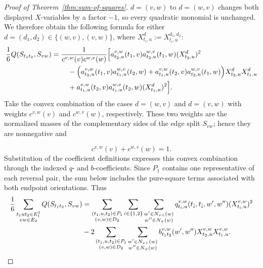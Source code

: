 \documentclass[12pt]{article}
\begin{document}
\begin{proof}[Proof of Theorem~\ref{thm:sum-of-squares}]
$d=(v,w)$ to $d=(w,v)$ changes both displayed $X$-variables by a factor
$-1$, so every quadratic monomial is unchanged.  We therefore obtain the
following formula for either
$d=(d_1,d_2)\in\{(w,v),(v,w)\}$, where
$X_{t_i,u}^{d}:=X_{t_i,u}^{d_1,d_2}$:
\begin{equation}\label{eq:display-037}
\begin{aligned}
\frac16Q(S_{t_1t_2},S_{vw})
={}&\frac1{c^{v,w}(v)c^{w,v}(w)}
\Bigl[
a_{t_2,u}^{v,w}(t_1,v)a_{t_2,u}^{w,v}(t_1,w)(X_{t_2,u}^{d})^2\\
&\quad-\Bigl(
a_{t_2,u}^{v,w}(t_1,v)a_{t_1,u}^{w,v}(t_2,w)
+a_{t_1,u}^{v,w}(t_2,v)a_{t_2,u}^{w,v}(t_1,w)
\Bigr)X_{t_2,u}^{d}X_{t_1,u}^{d}\\
&\quad+a_{t_1,u}^{v,w}(t_2,v)a_{t_1,u}^{w,v}(t_2,w)(X_{t_1,u}^{d})^2
\Bigr].
\end{aligned}
\end{equation}
Take the convex combination of the cases $d=(w,v)$ and $d=(v,w)$ with
weights $c^{v,w}(v)$ and $c^{w,v}(w)$, respectively.  These two weights are
the normalized masses of the complementary sides of the edge split $S_{vw}$;
hence they are nonnegative and

\begin{equation}\label{eq:display-038}
c^{v,w}(v)+c^{w,v}(w)=1.
\end{equation}
Substitution of the coefficient definitions expresses this convex combination
through the indexed $q$- and $b$-coefficients.
Since $P_1$ contains one representative of each
reversal pair, the sum below includes the pure-square terms associated with
both endpoint orientations.  Thus
\begin{align}
\frac16\sum_{\substack{t_1ut_2\in E_1^2\\vw\in E_2}}
Q(S_{t_1t_2},S_{vw})
&=\sum_{\substack{(t_1,u,t_2)\in P_1\\(v,w)\in D_2}}
\sum_{i\in\{1,2\}}
\sum_{\substack{w'\in N_{v+}(w)\\w''\in N_+(w)}}
q_{t_i,u}^{v,w}(t_{\bar i},t_{\bar i},w',w'')
(X_{t_i,u}^{v,w})^2                                        \notag\\
&-2\sum_{\substack{(t_1,u,t_2)\in P_1\\(v,w)\in D_2}}
\sum_{\substack{w'\in N_{v+}(w)\\w''\in N_+(w)}}
b_{t_1t_2}^{v,w}(w',w'')X_{t_2,u}^{v,w}X_{t_1,u}^{v,w}.
                                                               \label{eq:path-edge}
\end{align}


\end{proof}
\end{document}
